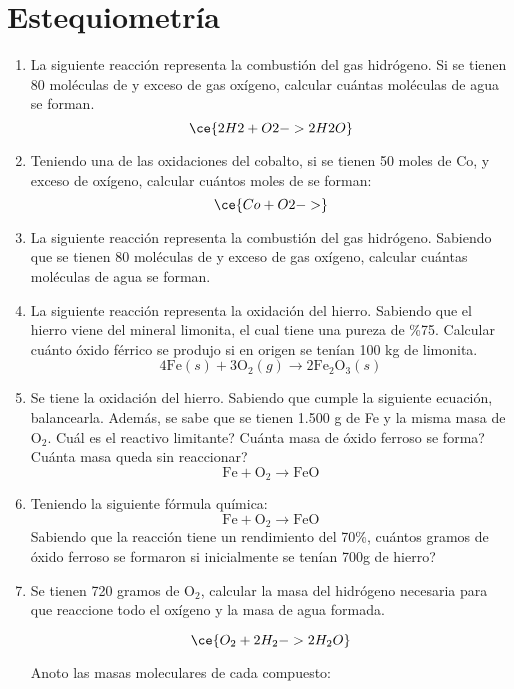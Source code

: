 \section{Estequiometría}

\begin{enumerate}
\item La siguiente reacción representa la combustión del gas hidrógeno. Si se tienen 80 moléculas de  y exceso de gas oxígeno, calcular cuántas moléculas de agua se forman.
$$
\ce{2H2 + O2 -> 2H2O}
$$

\item Teniendo una de las oxidaciones del cobalto, si se tienen 50 moles de Co, y exceso de oxígeno, calcular cuántos moles de   se forman:
$$
\ce{Co + O2 -> }
$$

\item La siguiente reacción representa la combustión del gas hidrógeno. Sabiendo que se tienen 80 moléculas de  y exceso de gas oxígeno, calcular cuántas moléculas de agua se forman.

\item La siguiente reacción representa la oxidación del hierro.
Sabiendo que el hierro viene del mineral limonita, el
cual tiene una pureza de \%75. Calcular cuánto óxido férrico
se produjo si en origen se tenían 100 kg de limonita.
$$4\text{Fe} (s) + 3\text{O}_2 (g) \rightarrow 2\text{Fe}_2\text{O}_3 (s)$$

\item Se tiene la oxidación del hierro. Sabiendo que cumple la siguiente ecuación, balancearla. Además, se sabe que se tienen 1.500 g de Fe y la misma masa de O$_2$. Cuál es el reactivo limitante? Cuánta masa de óxido ferroso se forma? Cuánta masa queda sin reaccionar?
$$\text{Fe} + \text{O}_2 \rightarrow \text{Fe}\text{O}$$


\item Teniendo la siguiente fórmula química:
$$\text{Fe} + \text{O}_2 \rightarrow \text{Fe}\text{O}$$
Sabiendo que la reacción tiene un rendimiento del 70\%, cuántos gramos de óxido ferroso se formaron si inicialmente se tenían 700g de hierro?


\item Se tienen 720 gramos de O$_2$, calcular la masa del hidrógeno
necesaria para que reaccione todo el oxígeno y la masa de 
agua formada.

$$\ce{O_2 + 2H_2 -> 2H_2O}$$

Anoto las masas moleculares de cada compuesto:


\end{enumerate}
